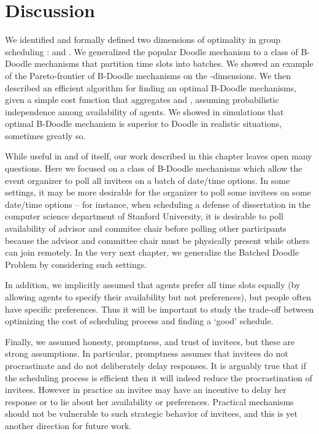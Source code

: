 \section{Discussion} \label{bdoodle:sec:Discussion}

We identified and formally defined two dimensions of optimality in
group scheduling : \Times and \Inconvenience. We generalized the popular
Doodle mechanism to a class of B-Doodle mechanisms that partition time
slots into batches. We showed an example of the Pareto-frontier of
B-Doodle mechanisms on the \Time-\Inconveniences dimensions. We then
described an efficient algorithm for finding an optimal B-Doodle
mechanisms, given a simple cost function that aggregates \Times and
\Inconvenience, assuming probabilistic independence among availability 
of agents. We showed in simulations that optimal B-Doodle mechanism 
is superior to Doodle in realistic situations, sometimes greatly so.

While useful in and of itself, our work described in this chapter leaves open many questions.
Here we focused on a class of B-Doodle mechanisms which allow the event organizer to poll all invitees on a batch of date/time options. In some settings, it may be more desirable for the organizer to poll some invitees on some date/time options -- for instance, when scheduling a defense of dissertation in the computer science department of Stanford University, it is desirable to poll availability of advisor and commitee chair before polling other participants because the advisor and committee chair must be physically present while others can join remotely. In the very next chapter, we generalize the Batched Doodle Problem by considering such settings. 

In addition, we implicitly assumed that agents prefer all time slots equally (by
allowing agents to specify their availability but not preferences),
but people often have specific preferences. Thus it will be important
to study the trade-off between optimizing the cost of scheduling
process and finding a `good' schedule.

Finally, we assumed honesty, promptness, and trust of invitees, but
these are strong assumptions. In particular, promptness assumes that
invitees do not procrastinate and do not deliberately delay responses.
It is arguably true that if the scheduling process is efficient then
it will indeed reduce the procrastination of invitees. However in
practice an invitee may have an incentive to delay her response or to
lie about her availability or preferences. Practical mechanisms should
not be vulnerable to such strategic behavior of invitees, and this is
yet another direction for future work.
